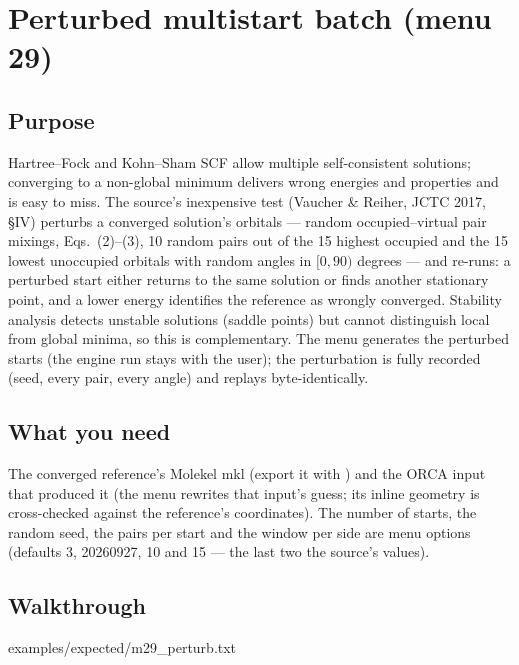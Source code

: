 \chapter{Perturbed multistart batch (menu 29)}
\label{ch:menu29}

\section{Purpose}

Hartree--Fock and Kohn--Sham SCF allow multiple self-consistent solutions;
converging to a non-global minimum delivers wrong energies and properties and
is easy to miss.  The source's inexpensive test (Vaucher \& Reiher, JCTC
2017, \S IV) perturbs a converged solution's orbitals --- random
occupied--virtual pair mixings, Eqs.~(2)--(3), 10 random pairs out of the 15
highest occupied and the 15 lowest unoccupied orbitals with random angles in
$[0, 90)$ degrees --- and re-runs: a perturbed start either returns to the
same solution or finds another stationary point, and a lower energy
identifies the reference as wrongly converged.  Stability analysis detects
unstable solutions (saddle points) but cannot distinguish local from global
minima, so this is complementary.  The menu generates the perturbed starts
(the engine run stays with the user); the perturbation is fully recorded
(seed, every pair, every angle) and replays byte-identically.

\section{What you need}

The converged reference's Molekel mkl (export it with
) and the ORCA input that produced it (the menu
rewrites that input's guess; its inline geometry is cross-checked against the
reference's coordinates).  The number of starts, the random seed, the pairs
per start and the window per side are menu options (defaults 3, 20260927,
10 and 15 --- the last two the source's values).

\section{Walkthrough}


  {examples/expected/m29_perturb.txt}

